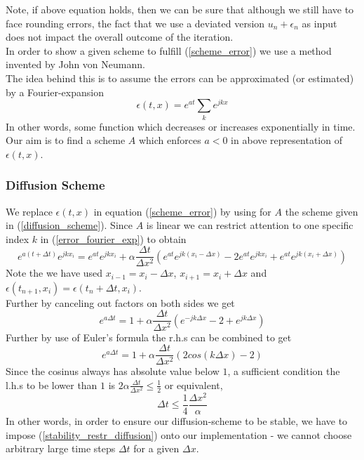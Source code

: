 \documentclass[]{article}
\begin{document}
Note, if above equation holds, then we can be sure that although we still have to face 
rounding errors, the fact that we use a deviated version $u_{n}+\epsilon_{n}$ as input does not impact the overall outcome of the iteration.\\
In order to show a given scheme to fulfill (\ref{scheme_error}) we use a method invented by John von Neumann.\\
The idea behind this is to assume the errors can be approximated (or estimated) by a Fourier-expansion
\begin{equation} \label{error_fourier_exp}
\epsilon(t,x)=e^{at}\sum_{k}e^{jkx}
\end{equation}
In other words, some function which decreases or increases exponentially in time. Our aim is to find a scheme $A$ which enforces $a<0$ in above representation of $\epsilon(t,x)$.\\

\subsubsection{Diffusion Scheme}
We replace $\epsilon(t,x)$ in equation (\ref{scheme_error}) by using for $A$ the scheme given in (\ref{diffusion_scheme}). Since $A$ is linear we can restrict attention to one specific index $k$ in (\ref{error_fourier_exp}) to obtain
\begin{equation*}
e^{a(t+\Delta t)}e^{jkx_{i}}=e^{at}e^{jkx_{i}}+\alpha\frac{\Delta t}{\Delta x^2}
\left(e^{at}e^{jk(x_{i}-\Delta x)} -2e^{at}e^{jkx_{i}}+e^{at}e^{jk(x_{i}+\Delta x)}\right)
\end{equation*}
Note the we have used $x_{i-1}=x_{i}-\Delta x$, $x_{i+1}=x_{i}+\Delta x$ and $\epsilon(t_{n+1}, x_{i})=\epsilon(t_{n}+\Delta t, x_{i})$.\\
Further by canceling out factors on both sides we get
\begin{equation*}
e^{a\Delta t}=1+\alpha\frac{\Delta t}{\Delta x^2}
\left(e^{-jk\Delta x} -2+e^{jk\Delta x}\right)
\end{equation*}
Further by use of Euler's formula the r.h.s can be combined to get
\begin{equation*}
e^{a\Delta t}=1+\alpha\frac{\Delta t}{\Delta x^2}
\left(2cos(k\Delta x) -2\right)
\end{equation*}
Since the cosinus always has absolute value below $1$, a sufficient condition the l.h.s to be lower than $1$ is $2\alpha\frac{\Delta t}{\Delta x^2}\leq\frac{1}{2}$ or equivalent,
\begin{equation} \label{stability_restr_diffusion}
\Delta t\leq \frac{1}{4}\frac{\Delta x^2}{\alpha}
\end{equation}
In other words, in order to ensure our diffusion-scheme to be stable, we have to impose (\ref{stability_restr_diffusion}) onto our implementation - we cannot choose arbitrary large time steps $\Delta t$ for a given $\Delta x$.
\end{document}
